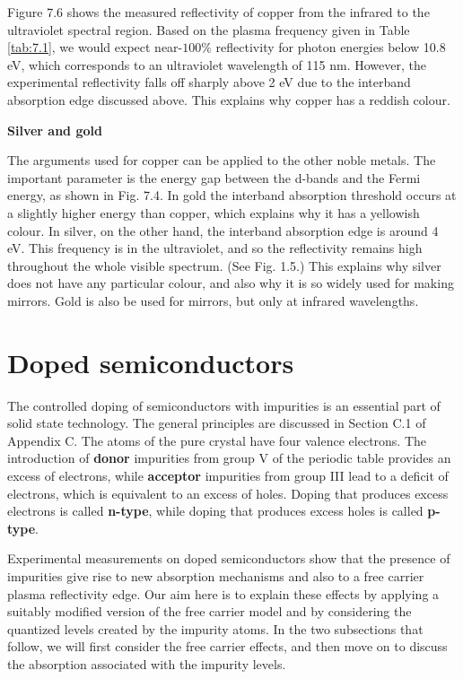 \documentclass[12pt]{book}
\begin{document}
Figure 7.6 shows the measured reflectivity of copper from the infrared to the ultraviolet spectral region. Based on the plasma frequency given in Table \ref{tab:7.1}, we would expect near-$100\%$ reflectivity for photon energies below 10.8 eV, which corresponds to an ultraviolet wavelength of 115 nm. However, the experimental reflectivity falls off sharply above 2 eV due to the interband absorption edge discussed above. This explains why copper has a reddish colour.

\textbf{Silver and gold}

The arguments used for copper can be applied to the other noble metals. The important parameter is the energy gap between the d-bands and the Fermi energy, as shown in Fig. 7.4. In gold the interband absorption threshold occurs at a slightly higher energy than copper, which explains why it has a yellowish colour. In silver, on the other hand, the interband absorption edge is around 4 eV. This frequency is in the ultraviolet, and so the reflectivity remains high throughout the whole visible spectrum. (See Fig. 1.5.) This explains why silver does not have any particular colour, and also why it is so widely used for making mirrors. Gold is also be used for mirrors, but only at infrared wavelengths.

\section{Doped semiconductors}
The controlled doping of semiconductors with impurities is an essential part of solid state technology. The general principles are discussed in Section C.1 of Appendix C. The atoms of the pure crystal have four valence electrons. The introduction of \textbf{donor} impurities from group V of the periodic table provides an excess of electrons, while \textbf{acceptor} impurities from group III lead to a deficit of electrons, which is equivalent to an excess of holes. Doping that produces excess electrons is called \textbf{n-type}, while doping that produces excess holes is called \textbf{p-type}.

Experimental measurements on doped semiconductors show that the presence of impurities give rise to new absorption mechanisms and also to a free carrier plasma reflectivity edge. Our aim here is to explain these effects by applying a suitably modified version of the free carrier model and by considering the quantized levels created by the impurity atoms. In the two subsections that follow, we will first consider the free carrier effects, and then move on to discuss the absorption associated with the impurity levels.
\end{document}

